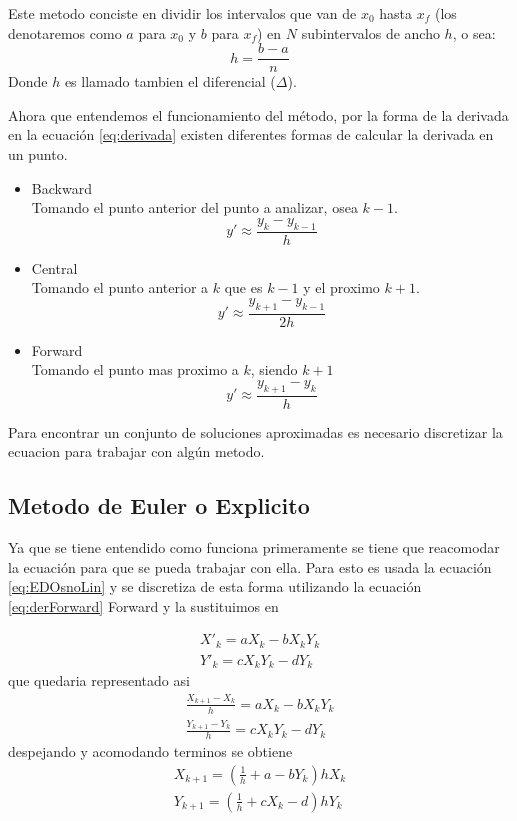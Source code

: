 \documentclass{report}
\begin{document}
Este metodo conciste en dividir los intervalos que van de $x_0$ hasta $x_f$ (los denotaremos como $a$ para $x_0$ y $b$ para $x_f$) en $N$ subintervalos de ancho $h$, o sea:
\begin{equation*}
h=\frac{b-a}{n}
\end{equation*}
Donde $h$ es llamado tambien el diferencial ($\Delta$).

Ahora que entendemos el funcionamiento del método, por la forma de la derivada en la ecuación \ref{eq:derivada} existen diferentes formas de calcular la derivada en un punto.

\begin{itemize}
\item Backward\\
Tomando el punto anterior del punto a analizar, osea $k-1$.
	\begin{equation}
		\label{eq:derBackward}
		y'\approx\frac{y_k-y_{k-1}}{h}
	\end{equation}
\item Central\\
Tomando el punto anterior a $k$ que es $k-1$ y el proximo $k+1$.
	\begin{equation}			   							\label{eq:derCentral}
		y' \approx \frac{y_{k+1}-y_{k-1}}{2h}
	\end{equation}
\item Forward\\
Tomando el punto mas proximo a $k$, siendo $k+1$
	\begin{equation}
		\label{eq:derForward}
		y'\approx \frac{y_{k+1}-y_k}{h}
	\end{equation}
\end{itemize}

Para encontrar un conjunto de soluciones aproximadas es necesario discretizar la ecuacion para trabajar con algún metodo.

\subsection{Metodo de Euler o Explicito}
Ya que se tiene entendido como funciona primeramente se tiene que reacomodar la ecuación para que se pueda trabajar con ella. 
Para esto es usada la ecuación \ref{eq:EDOsnoLin} y se discretiza de esta forma utilizando la ecuación \ref{eq:derForward} Forward y la sustituimos en 

\begin{align*}
X'_k= aX_{k}-bX_{k}Y_{k}  \\
Y'_k= cX_{k}Y_k-dY_k
\end{align*}
que quedaria representado asi
\begin{align*}
\frac{X_{k+1}-X_k}{h} = aX_{k}-bX_{k}Y_{k}  \\
\frac{Y_{k+1}-Y_k}{h} = cX_{k}Y_k-dY_k
\end{align*}
despejando y acomodando terminos se obtiene
\begin{align*}
X_{k+1}=(\frac{1}{h}+a-bY_k)hX_k \\
Y_{k+1}=(\frac{1}{h}+cX_k-d)hY_k
\end{align*}
\end{document}
